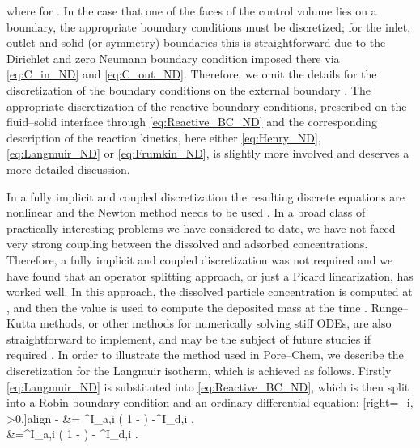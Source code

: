 \documentclass[preprint, 1p, authoryear]{elsarticle}
\begin{document}
where   for .   In the case that one of the faces of the control volume lies on a boundary, the appropriate boundary conditions must be  discretized; for the inlet, outlet and solid (or symmetry) boundaries this is straightforward due to the Dirichlet and zero Neumann boundary condition imposed there via \eqref{eq:C_in_ND} and \eqref{eq:C_out_ND}. Therefore, we omit the details  for the discretization of the boundary conditions on the external boundary .  The appropriate discretization of the reactive boundary conditions, prescribed on the fluid--solid interface through \eqref{eq:Reactive_BC_ND}   and the corresponding description of the  reaction kinetics, here either \eqref{eq:Henry_ND},   \eqref{eq:Langmuir_ND} or \eqref{eq:Frumkin_ND},  is slightly more involved and deserves a more detailed discussion.


In a fully implicit and coupled discretization the resulting discrete equations are  nonlinear  and the Newton method needs to be used  \citep{Kelley1995Iterative}.  In a broad class of practically interesting problems we have considered to date, we have not faced very strong coupling between the dissolved and adsorbed concentrations. Therefore, a fully implicit and coupled discretization was not required and we have found that an operator splitting approach, or just a Picard linearization, has worked well. In this approach, the dissolved particle concentration is computed at  , and then the value is  used  to compute the  deposited mass at the time . 
Runge--Kutta methods, or other methods for numerically solving stiff ODEs, are also straightforward to 
implement, and may be the 
subject of future studies if required \citep{Kelley1995Iterative}.  
In order to illustrate the method used in Pore--Chem, we describe the  discretization for the Langmuir isotherm, which is achieved as follows. Firstly \eqref{eq:Langmuir_ND} is substituted into \eqref{eq:Reactive_BC_ND}, which is then split into a Robin boundary condition and an ordinary differential equation:
[right={\qquad {}\in \hat{\Gamma}_i, \: >0.}]{align}
- \hat{\nabla} \cdot {}  &= ^{\textrm{I}}_{a,i} \left( 1 - \right) -^{\textrm{I}}_{d,i} , \label{eq:Robin_part} \\
 &=^{\textrm{I}}_{a,i} \left( 1 - \right) - ^{\textrm{I}}_{d,i}  . \label{eq:ODE}
\end{document}
